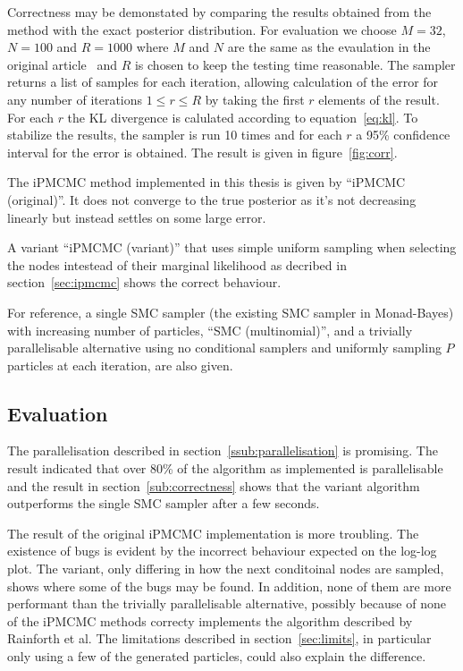 Correctness may be demonstated by comparing the results obtained from the method with the exact posterior distribution. For evaluation we choose $M=32$, $N=100$ and $R=1000$ where $M$ and $N$ are the same as the evaulation in the original article~\cite{ipmcmc} and $R$ is chosen to keep the testing time reasonable. The sampler returns a list of samples for each iteration, allowing calculation of the error for any number of iterations $1 \leq r \leq R$ by taking the first $r$ elements of the result. For each $r$ the KL divergence is calulated according to equation~\ref{eq:kl}. To stabilize the results, the sampler is run 10 times and for each $r$ a 95\% confidence interval for the error is obtained. The result is given in figure~\ref{fig:corr}.

The iPMCMC method implemented in this thesis is given by ``iPMCMC (original)''. It does not converge to the true posterior as it's not decreasing linearly but instead settles on some large error.

A variant ``iPMCMC (variant)'' that uses simple uniform sampling when selecting the nodes intestead of their marginal likelihood as decribed in section~\ref{sec:ipmcmc} shows the correct behaviour.

For reference, a single SMC sampler (the existing SMC sampler in Monad-Bayes) with increasing number of particles, ``SMC (multinomial)'', and a trivially parallelisable alternative using no conditional samplers and uniformly sampling $P$ particles at each iteration, are also given.

\subsection{Evaluation}

The parallelisation described in section~\ref{ssub:parallelisation} is promising. The result indicated that over 80\% of the algorithm as implemented is parallelisable and the result in section~\ref{sub:correctness} shows that the variant algorithm outperforms the single SMC sampler after a few seconds.

The result of the original iPMCMC implementation is more troubling. The existence of bugs is evident by the incorrect behaviour expected on the log-log plot. The variant, only differing in how the next conditoinal nodes are sampled, shows where some of the bugs may be found. In addition, none of them are more performant than the trivially parallelisable alternative, possibly because of none of the iPMCMC methods correcty implements the algorithm described by Rainforth et al. The limitations described in section~\ref{sec:limits}, in particular only using a few of the generated particles, could also explain the difference.
